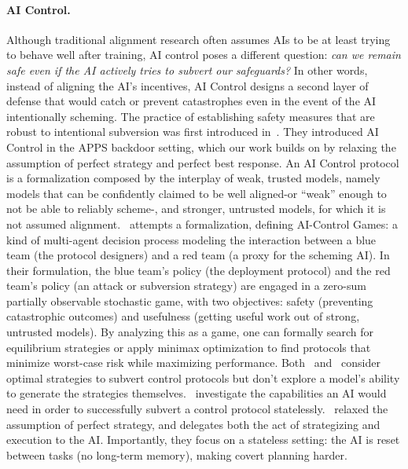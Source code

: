 \paragraph{AI Control.} Although traditional alignment research often assumes AIs to be at least trying to behave well after training, AI control poses a different question: \emph{can we remain safe even if the AI actively tries to subvert our safeguards?} In other words, instead of aligning the AI’s incentives, AI Control designs a second layer of defense that would catch or prevent catastrophes even in the event of the AI intentionally scheming. The practice of establishing safety measures that are robust to intentional subversion was first introduced in~\citet{greenblatt2023ai}. They introduced AI Control in the APPS backdoor setting, which our work builds on by relaxing the assumption of perfect strategy and perfect best response. An AI Control protocol is a formalization composed by the interplay of weak, trusted models, namely models that can be confidently claimed to be well aligned-or ``weak'' enough to not be able to reliably scheme-, and stronger, untrusted models, for which it is not assumed alignment.~\citet{griffin2024games} attempts a formalization, defining AI-Control Games: a kind of multi-agent decision process modeling the interaction between a blue team (the protocol designers) and a red team (a proxy for the scheming AI). In their formulation, the blue team’s policy (the deployment protocol) and the red team’s policy (an attack or subversion strategy) are engaged in a zero-sum partially observable stochastic game, with two objectives: safety (preventing catastrophic outcomes) and usefulness (getting useful work out of strong, untrusted models). By analyzing this as a game, one can formally search for equilibrium strategies or apply minimax optimization to find protocols that minimize worst-case risk while maximizing performance. Both~\citet{greenblatt2023ai} and~\citet{griffin2024games} consider optimal strategies to subvert control protocols but don't explore a model’s ability to generate the strategies themselves.~\citet{mallen2024subversion} investigate the capabilities an AI would need in
order to successfully subvert a control protocol statelessly.~\citet{mallen2024subversion} relaxed the assumption of perfect strategy, and delegates both the act of strategizing and execution to the AI. Importantly, they focus on a stateless setting: the AI is reset between tasks (no long-term memory), making covert planning harder.
\\
